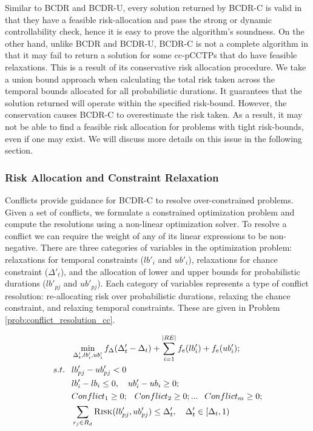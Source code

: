 \documentclass[jair,twoside,11pt,theapa]{article}
\begin{document}
Similar to BCDR and BCDR-U, every solution returned by BCDR-C is valid in that
they have a feasible risk-allocation and pass the strong or dynamic
controllability check, hence it is easy to prove the algorithm's soundness. On
the other hand, unlike BCDR and BCDR-U, BCDR-C is not a complete algorithm in
that it may fail to return a solution for some cc-pCCTPs that do have feasible
relaxations. This is a result of its conservative risk allocation procedure. We
take a union bound approach when calculating the total risk taken across the
temporal bounds allocated for all probabilistic durations. It guarantees that
the solution returned will operate within the specified risk-bound. However, the
conservation causes BCDR-C to overestimate the risk taken. As a result, it may
not be able to find a feasible risk allocation for problems with tight
risk-bounds, even if one may exist. We will discuss more details on this issue
in the following section.



\subsubsection{Risk Allocation and Constraint Relaxation}

Conflicts provide guidance for BCDR-C to resolve over-constrained problems. Given
a set of conflicts, we formulate a constrained optimization problem and compute
the resolutions using a non-linear optimization solver. To resolve a conflict we
can require the weight of any of its linear expressions to be
non-negative. There are three categories of variables in the optimization problem: relaxations
for temporal constraints ($lb'_{i}$ and $ub'_{i}$), relaxations for chance
constraint ($\Delta'_t$), and the allocation of lower and upper bounds for
probabilistic durations ($lb'_{pj}$ and $ub'_{pj}$). Each category of variables
represents a type of conflict resolution: re-allocating risk over probabilistic
durations, relaxing the chance constraint, and relaxing temporal constraints. These
are given in Problem \ref{prob:conflict_resolution_cc}.

\begin{problem}
	\begin{align}
	&\phantom{=}	\min_{\Delta'_t,{lb_i',ub_i'}}f_\Delta(\Delta'_t-\Delta_t)+\sum\limits_{i=1}^{|RE|}f_{e}(lb_i') + f_{e}(ub_i');
	\label{eqn:obj}\\
	s.t. 	&\phantom{=}	lb'_{pj} - ub'_{pj} < 0   \label{eqn:prob_bds}\\
	&\phantom{=} lb_i'-lb_i \leq 0, \quad ub_i'-ub_i \geq 0; \label{eqn:relax_req}\\
	&\phantom{=} Conflict_1 \geq 0; \phantom{=} Conflict_2 \geq 0;  ... \phantom{=} Conflict_m \geq 0; \label{eqn:conf_res_cc}\\
	&\phantom{=}	\sum_{r_j\in R_d}\textsc{Risk}(lb'_{pj},ub'_{pj}) \leq \Delta'_t, \quad \Delta'_t \in \left[\Delta_t,1\right) \label{eqn:cc}
	\end{align}
	\label{prob:conflict_resolution_cc}
\end{problem}
\end{document}
